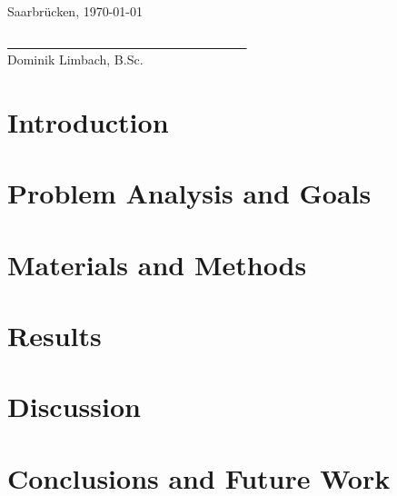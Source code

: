 \documentclass[
    12pt,
    a4paper,
	chapterprefix=false,
	parskip=full,
	headings=normal,
	numbers=noenddot
]{scrreprt}
\begin{document}
\vspace{1cm}

Saarbrücken, \today\\

\vspace{1.5cm}

\underline{~ ~ ~ ~ ~ ~ ~ ~ ~ ~ ~ ~ ~ ~ ~ ~ ~ ~ ~ ~ ~ ~ ~}\\
\small
Dominik Limbach, B.Sc.
\normalsize

\newpage

\renewcommand{\contentsname}{Contents}
\hypersetup{linkcolor=black}
\tableofcontents
\hypersetup{linkcolor=darkblue}

\newpage


\chapter{Introduction}




\chapter{Problem Analysis and Goals}




\chapter{Materials and Methods}




\chapter{Results}




\chapter{Discussion}




\chapter{Conclusions and Future Work}




\appendix
\end{document}
